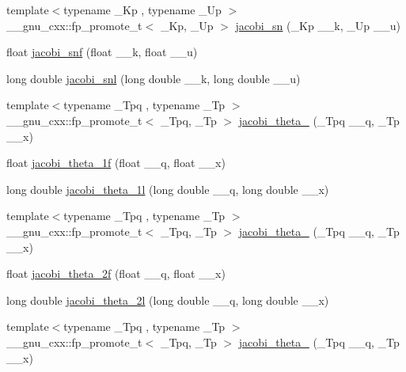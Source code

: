 \begin{DoxyCompactItemize}
\item 
{\footnotesize template$<$typename \+\_\+\+Kp , typename \+\_\+\+Up $>$ }\\\+\_\+\+\_\+gnu\+\_\+cxx\+::fp\+\_\+promote\+\_\+t$<$ \+\_\+\+Kp, \+\_\+\+Up $>$ \hyperlink{group__mathsf__gnu_ga49d5e18152dd0dd0f496b8c8582e7045}{jacobi\+\_\+sn} (\+\_\+\+Kp \+\_\+\+\_\+k, \+\_\+\+Up \+\_\+\+\_\+u)
\item 
float \hyperlink{group__mathsf__gnu_ga5981245b7343da6e21d445bb01fdba9c}{jacobi\+\_\+snf} (float \+\_\+\+\_\+k, float \+\_\+\+\_\+u)
\item 
long double \hyperlink{group__mathsf__gnu_ga1c13539e3b051a07b1c28aa8a0aeb1b4}{jacobi\+\_\+snl} (long double \+\_\+\+\_\+k, long double \+\_\+\+\_\+u)
\item 
{\footnotesize template$<$typename \+\_\+\+Tpq , typename \+\_\+\+Tp $>$ }\\\+\_\+\+\_\+gnu\+\_\+cxx\+::fp\+\_\+promote\+\_\+t$<$ \+\_\+\+Tpq, \+\_\+\+Tp $>$ \hyperlink{group__mathsf__gnu_ga996ca8c1fff75e2d4f196e99e0919933}{jacobi\+\_\+theta\+\_} (\+\_\+\+Tpq \+\_\+\+\_\+q, \+\_\+\+Tp \+\_\+\+\_\+x)
\item 
float \hyperlink{group__mathsf__gnu_gacccd2107c26e39400e589a59e0af674a}{jacobi\+\_\+theta\+\_\+1f} (float \+\_\+\+\_\+q, float \+\_\+\+\_\+x)
\item 
long double \hyperlink{group__mathsf__gnu_ga823eba555ecac89556a0f4c1e62dbc5a}{jacobi\+\_\+theta\+\_\+1l} (long double \+\_\+\+\_\+q, long double \+\_\+\+\_\+x)
\item 
{\footnotesize template$<$typename \+\_\+\+Tpq , typename \+\_\+\+Tp $>$ }\\\+\_\+\+\_\+gnu\+\_\+cxx\+::fp\+\_\+promote\+\_\+t$<$ \+\_\+\+Tpq, \+\_\+\+Tp $>$ \hyperlink{group__mathsf__gnu_gaf6b13dac1f112a870299d75cb4cf42cc}{jacobi\+\_\+theta\+\_} (\+\_\+\+Tpq \+\_\+\+\_\+q, \+\_\+\+Tp \+\_\+\+\_\+x)
\item 
float \hyperlink{group__mathsf__gnu_gaa99e91c0753410a42b57cbf417cf7ea0}{jacobi\+\_\+theta\+\_\+2f} (float \+\_\+\+\_\+q, float \+\_\+\+\_\+x)
\item 
long double \hyperlink{group__mathsf__gnu_ga2db5cb3025b9068e79dc7aa21bc9af5b}{jacobi\+\_\+theta\+\_\+2l} (long double \+\_\+\+\_\+q, long double \+\_\+\+\_\+x)
\item 
{\footnotesize template$<$typename \+\_\+\+Tpq , typename \+\_\+\+Tp $>$ }\\\+\_\+\+\_\+gnu\+\_\+cxx\+::fp\+\_\+promote\+\_\+t$<$ \+\_\+\+Tpq, \+\_\+\+Tp $>$ \hyperlink{group__mathsf__gnu_gaf4eac2990db1dadba66ae688ceaa6403}{jacobi\+\_\+theta\+\_} (\+\_\+\+Tpq \+\_\+\+\_\+q, \+\_\+\+Tp \+\_\+\+\_\+x)

\end{DoxyCompactItemize}
